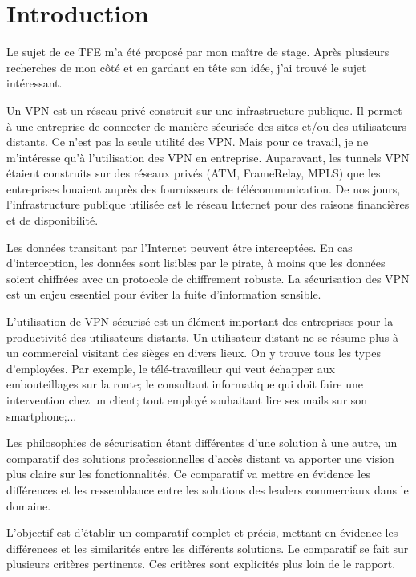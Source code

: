 \chapter*{Introduction}
Le sujet de ce TFE m'a été proposé par mon maître de stage.
Après plusieurs recherches de mon côté et en gardant en tête son idée, j'ai trouvé le sujet intéressant.

Un VPN est un réseau privé construit sur une infrastructure publique. 
Il permet à une entreprise de connecter de manière sécurisée des sites et/ou des utilisateurs distants.
Ce n'est pas la seule utilité des VPN. 
Mais pour ce travail, je ne m'intéresse qu'à l'utilisation des VPN en entreprise.
Auparavant, les tunnels VPN étaient construits sur des réseaux privés (ATM, FrameRelay, MPLS) que les entreprises louaient auprès des fournisseurs de télécommunication.
De nos jours, l'infrastructure publique utilisée est le réseau Internet pour des raisons financières et de disponibilité.

Les données transitant par l'Internet peuvent être interceptées.
En cas d'interception, les données sont lisibles par le pirate, à moins que les données soient chiffrées avec un protocole de chiffrement robuste.
La sécurisation des VPN est un enjeu essentiel pour éviter la fuite d'information sensible.

L'utilisation de VPN sécurisé est un élément important des entreprises pour la productivité des utilisateurs distants. 
Un utilisateur distant ne se résume plus à un commercial visitant des sièges en divers lieux.
On y trouve tous les types d'employées. Par exemple, le télé-travailleur qui veut échapper aux embouteillages sur la route; le consultant informatique qui doit faire une intervention chez un client; tout employé souhaitant lire ses mails sur son smartphone;...

Les philosophies de sécurisation étant différentes d'une solution à une autre, un comparatif des solutions professionnelles d'accès distant va apporter une vision plus claire sur les fonctionnalités.
Ce comparatif va mettre en évidence les différences et les ressemblance entre les solutions des leaders commerciaux dans le domaine.

L'objectif est d'établir un comparatif complet et précis, mettant en évidence les différences et les similarités entre les différents solutions.
Le comparatif se fait sur plusieurs critères pertinents. 
Ces critères sont explicités plus loin de le rapport.\\

